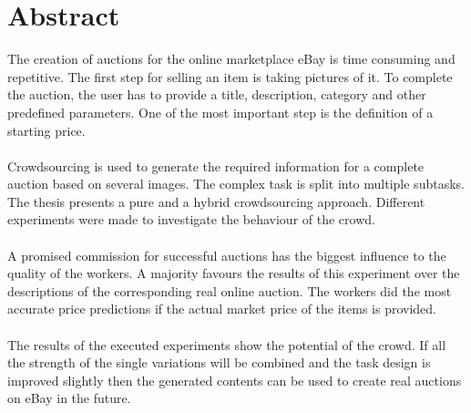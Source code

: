 \chapter*{Abstract}
\thispagestyle{empty}
The creation of auctions for the online marketplace eBay is time consuming and repetitive. The first step for selling an item is taking pictures of it. To complete the auction, the user has to provide a title, description, category and other predefined parameters. One of the most important step is the definition of a starting price.\\\\
Crowdsourcing is used to generate the required information for a complete auction based on several images. The complex task is split into multiple subtasks. The thesis presents a pure and a hybrid crowdsourcing approach. Different experiments were made to investigate the behaviour of the crowd.\\\\
A promised commission for successful auctions has the biggest influence to the quality of the workers. A majority favours the results of this experiment over the descriptions of the corresponding real online auction. The workers did the most accurate price predictions if the actual market price of the items is provided.\\\\  
The results of the executed experiments show the potential of the crowd. If all the strength of the single variations will be combined and the task design is improved slightly then the generated contents can be used to create real auctions on eBay in the future.
\clearpage
